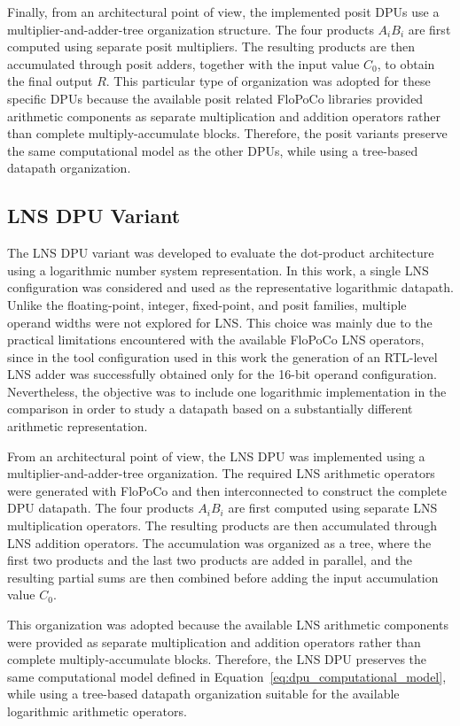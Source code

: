 Finally, from an architectural point of view, the implemented posit DPUs use a multiplier-and-adder-tree organization structure. The four products $A_iB_i$ are first computed using separate posit multipliers. The resulting products are then accumulated through posit adders, together with the input value $C_0$, to obtain the final output $R$. This particular type of organization was adopted for these specific DPUs because the available posit related FloPoCo libraries provided arithmetic components as separate multiplication and addition operators rather than complete multiply-accumulate blocks. Therefore, the posit variants preserve the same computational model as the other DPUs, while using a tree-based datapath organization. 

\subsection{LNS DPU Variant}

The LNS DPU variant was developed to evaluate the dot-product architecture using a logarithmic number system representation. In this work, a single LNS configuration was considered and used as the representative logarithmic datapath. Unlike the floating-point, integer, fixed-point, and posit families, multiple operand widths were not explored for LNS. This choice was mainly due to the practical limitations encountered with the available FloPoCo LNS operators, since in the tool configuration used in this work the generation of an RTL-level LNS adder was successfully obtained only for the 16-bit operand configuration. Nevertheless, the objective was to include one logarithmic implementation in the comparison in order to study a datapath based on a substantially different arithmetic representation.

From an architectural point of view, the LNS DPU was implemented using a multiplier-and-adder-tree organization. The required LNS arithmetic operators were generated with FloPoCo and then interconnected to construct the complete DPU datapath. The four products $A_iB_i$ are first computed using separate LNS multiplication operators. The resulting products are then accumulated through LNS addition operators. The accumulation was organized as a tree, where the first two products and the last two products are added in parallel, and the resulting partial sums are then combined before adding the input accumulation value $C_0$.

This organization was adopted because the available LNS arithmetic components were provided as separate multiplication and addition operators rather than complete multiply-accumulate blocks. Therefore, the LNS DPU preserves the same computational model defined in Equation~\eqref{eq:dpu_computational_model}, while using a tree-based datapath organization suitable for the available logarithmic arithmetic operators.

